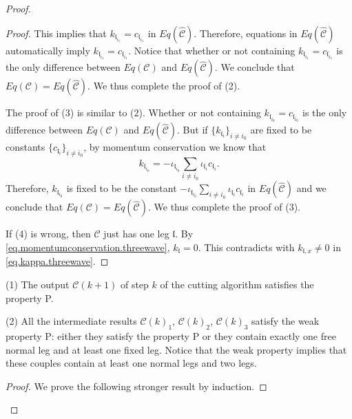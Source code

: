 \begin{proof}
\begin{proof}
This implies that $k_{\mathfrak{l}_{i_1}}=c_{\mathfrak{l}_{i_1}}$ in $Eq(\widehat{\mathcal{C}})$. Therefore, equations in $Eq(\widehat{\mathcal{C}})$ automatically imply $k_{\mathfrak{l}_{i_1}}=c_{\mathfrak{l}_{i_1}}$. Notice that whether or not containing $k_{\mathfrak{l}_{i_1}}=c_{\mathfrak{l}_{i_1}}$ is the only difference between $Eq(\mathcal{C})$ and $Eq(\widehat{\mathcal{C}})$. We conclude that $Eq(\mathcal{C})=Eq(\widehat{\mathcal{C}})$. We thus complete the proof of (2).

The proof of (3) is similar to (2). Whether or not containing $k_{\mathfrak{l}_{i_0}}=c_{\mathfrak{l}_{i_0}}$ is the only difference between $Eq(\mathcal{C})$ and $Eq(\widehat{\mathcal{C}})$. But if $\{k_{\mathfrak{l}_{i}}\}_{i\ne i_0}$ are fixed to be constants $\{c_{\mathfrak{l}_{i}}\}_{i\ne i_0}$, by momentum conservation we know that 
\begin{equation}
     k_{\mathfrak{l}_{i_0}}=-\iota_{\mathfrak{l}_{i_0}}\sum_{i\ne i_0} \iota_{\mathfrak{l}_i}c_{\mathfrak{l}_i}.
\end{equation}
Therefore, $k_{\mathfrak{l}_{i_0}}$ is fixed to be the constant $-\iota_{\mathfrak{l}_{i_0}}\sum_{i\ne i_0} \iota_{\mathfrak{l}_i}c_{\mathfrak{l}_i}$ in $Eq(\widehat{\mathcal{C}})$ and we conclude that $Eq(\mathcal{C})=Eq(\widehat{\mathcal{C}})$. We thus complete the proof of (3).

If (4) is wrong, then $\mathcal{C}$ just has one leg $\mathfrak{l}$. By \eqref{eq.momentumconservation.threewave}, $k_{\mathfrak{l}}=0$. This contradicts with $k_{\mathfrak{l},x}\ne 0$ in \eqref{eq.kappa.threewave}.
\end{proof}







\begin{lem}\label{lem.normleg} %
(1) The output $\mathcal{C}(k+1)$ of step $k$ of the cutting algorithm satisfies the property P.

(2) All the intermediate results $\mathcal{C}(k)_1$, $\mathcal{C}(k)_2$, $\mathcal{C}(k)_3$ satisfy the weak property P: either they satisfy the property P or they contain exactly one free normal leg and at least one fixed leg. Notice that the weak property implies that these couples contain at least one normal legs and two legs.
\end{lem}
\begin{proof}
We prove the following stronger result by induction.


\end{proof}
\end{proof}
